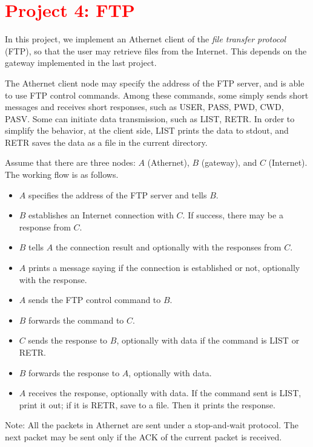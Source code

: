 \documentclass[11pt, conference]{IEEEtran}
\newcommand{\tcr}{\textcolor{red}}
\begin{document}
\section{\tcr{Project 4: FTP}}

In this project, we implement an Athernet client of the \emph{file transfer protocol} (FTP), so that the user may retrieve files from the Internet. This depends on the gateway implemented in the last project.

The Athernet client node may specify the address of the FTP server, and is able to use FTP control commands. Among these commands, some simply sends short messages and receives short responses, such as \textsf{USER}, \textsf{PASS}, \textsf{PWD}, \textsf{CWD}, \textsf{PASV}. Some can initiate data transmission, such as \textsf{LIST}, \textsf{RETR}. In order to simplify the behavior, at the client side, \textsf{LIST} prints the data to \textsf{stdout}, and \textsf{RETR} saves the data as a file in the current directory.

Assume that there are three nodes: $A$ (Athernet), $B$ (gateway), and $C$ (Internet). The working flow is as follows.
\begin{itemize}
\item $A$ specifies the address of the FTP server and tells $B$.
\item $B$ establishes an Internet connection with $C$. If success, there may be a response from $C$.
\item $B$ tells $A$ the connection result and optionally with the responses from $C$.
\item $A$ prints a message saying if the connection is established or not, optionally with the response.
\item $A$ sends the FTP control command to $B$.
\item $B$ forwards the command to $C$.
\item $C$ sends the response to $B$, optionally with data if the command is \textsf{LIST} or \textsf{RETR}.
\item $B$ forwards the response to $A$, optionally with data.
\item $A$ receives the response, optionally with data. If the command sent is \textsf{LIST}, print it out; if it is \textsf{RETR}, save to a file. Then it prints the response.
\end{itemize}
Note: All the packets in Athernet are sent under a stop-and-wait protocol. The next packet may be sent only if the ACK of the current packet is received.
\end{document}
